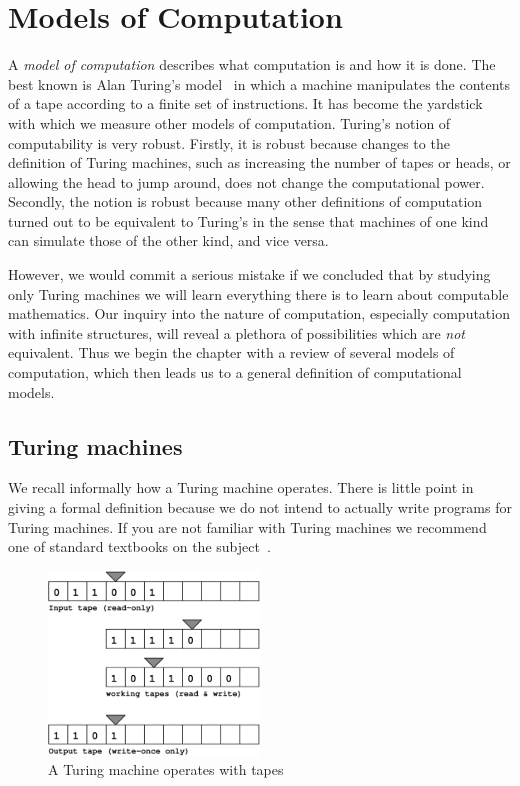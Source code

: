 \chapter{Models of Computation}
\label{cha:models}


A \emph{model of computation} describes what computation is and how it
is done. The best known is Alan Turing's
model~\cite{turing37:_comput_number_with_applic_to_entsc} in which a
machine manipulates the contents of a tape according to a finite set
of instructions. It has become the yardstick with which we measure
other models of computation. Turing's notion of computability is very
robust. Firstly, it is robust because changes to the definition of
Turing machines, such as increasing the number of tapes or heads, or
allowing the head to jump around, does not change the computational
power. Secondly, the notion is robust because many other definitions
of computation turned out to be equivalent to Turing's in the sense
that machines of one kind can simulate those of the other kind, and
vice versa.

However, we would commit a serious mistake if we concluded that by
studying only Turing machines we will learn everything there is to
learn about computable mathematics. Our inquiry into the nature of
computation, especially computation with infinite structures, will
reveal a plethora of possibilities which are \emph{not} equivalent.
Thus we begin the chapter with a review of several models of
computation, which then leads us to a general definition of
computational models.


\section{Turing machines}
\label{sec:turing-machines}

We recall informally how a Turing machine operates. There is little
point in giving a formal definition because we do not intend to
actually write programs for Turing machines. If you are not familiar
with Turing machines we recommend one of standard textbooks on the
subject~\cite{odifreddi89:_class_recur_theor,h.r.92:_theor_recur_funct_effec_comput,davis58:_comput_unsol}.

\begin{figure}[htbp]
  \centering
  \includegraphics[width=0.5\textwidth]{turing_machine}
  \caption{A Turing machine operates with tapes}
  \label{fig:turing-machine}
\end{figure}


